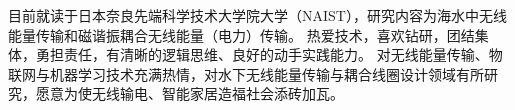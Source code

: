 

\begin{cvparagraph}

目前就读于日本奈良先端科学技术大学院大学（NAIST），研究内容为海水中无线能量传输和磁谐振耦合无线能量（电力）传输。
热爱技术，喜欢钻研，团结集体，勇担责任，有清晰的逻辑思维、良好的动手实践能力。
对无线能量传输、物联网与机器学习技术充满热情，对水下无线能量传输与耦合线圈设计领域有所研究，愿意为使无线输电、智能家居造福社会添砖加瓦。
\end{cvparagraph}